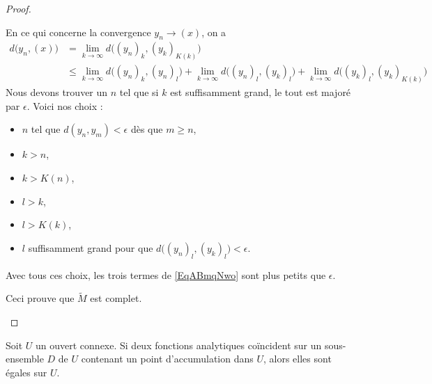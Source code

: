 \begin{proof}
\begin{subproof}
        En ce qui concerne la convergence \( y_n\to (x)\), on a
        \begin{subequations}
            \begin{align}
                d\big( y_n,(x) \big)&=\lim_{k\to \infty} d\big( (y_n)_k,(y_k)_{K(k)} \big)\\
                &\leq \lim_{k\to \infty} d\big( (y_n)_k,(y_n)_l \big)+\lim_{k\to \infty} d\big( (y_n)_l,(y_k)_{l} \big)+\lim_{k\to \infty} d\big( (y_k)_l,(y_k)_{K(k)} \big)    \label{EqABmqNwo}
            \end{align}
        \end{subequations}
        Nous devons trouver un \( n\) tel que si \( k\) est suffisamment grand, le tout est majoré par \( \epsilon\). Voici nos choix :
        \begin{itemize}
            \item \( n\) tel que \( d(y_n,y_m)<\epsilon\) dès que \( m\geq n\),
            \item \( k>n\),
            \item \( k>K(n)\),
            \item \( l>k\),
            \item \( l>K(k)\),
            \item \( l\) suffisamment grand pour que \( d\big( (y_n)_l,(y_k)_l \big)<\epsilon\).
        \end{itemize}
        Avec tous ces choix, les trois termes de \eqref{EqABmqNwo} sont plus petits que \( \epsilon\).

        Ceci prouve que \( \tilde M\) est complet.
    \end{subproof}
\end{proof}

\begin{theorem}\label{ThoAVBCewB}
    Soit \( U\) un ouvert connexe. Si deux fonctions analytiques coïncident sur un sous-ensemble \( D\) de \( U\) contenant un point d'accumulation dans \( U\), alors elles sont égales sur \( U\).
\end{theorem}



